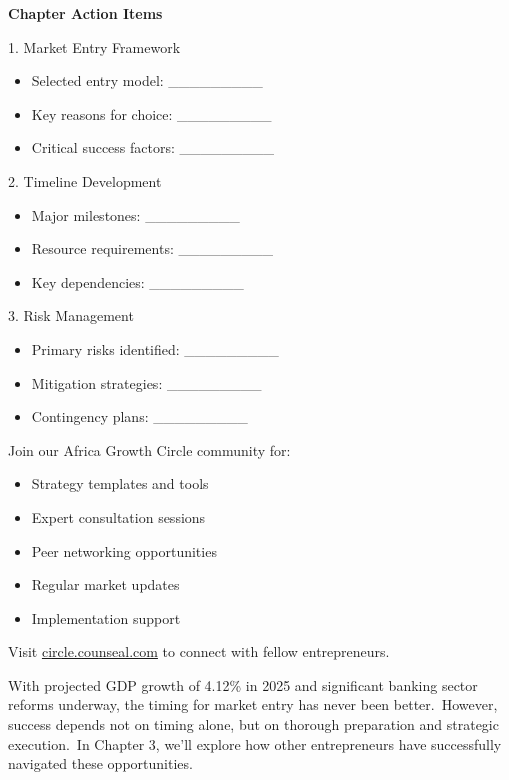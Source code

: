 \begin{workshopbox}
\textbf{Chapter Action Items}

1. Market Entry Framework
\begin{itemize}
    \item Selected entry model: \_\_\_\_\_\_\_\_\_
    \item Key reasons for choice: \_\_\_\_\_\_\_\_\_
    \item Critical success factors: \_\_\_\_\_\_\_\_\_
\end{itemize}

2. Timeline Development
\begin{itemize}
    \item Major milestones: \_\_\_\_\_\_\_\_\_
    \item Resource requirements: \_\_\_\_\_\_\_\_\_
    \item Key dependencies: \_\_\_\_\_\_\_\_\_
\end{itemize}

3. Risk Management
\begin{itemize}
    \item Primary risks identified: \_\_\_\_\_\_\_\_\_
    \item Mitigation strategies: \_\_\_\_\_\_\_\_\_
    \item Contingency plans: \_\_\_\_\_\_\_\_\_
\end{itemize}
\end{workshopbox}

\begin{communitybox}
Join our Africa Growth Circle community for:
\begin{itemize}
    \item Strategy templates and tools
    \item Expert consultation sessions
    \item Peer networking opportunities
    \item Regular market updates
    \item Implementation support
\end{itemize}
Visit \href{https://viz.li/csl-book-ngbiz}{circle.counseal.com} to connect with fellow entrepreneurs.
\end{communitybox}

\begin{importantbox}
With projected GDP growth of 4.12\% in 2025 and significant banking sector reforms underway, the timing for market entry has never been better.\ However, success depends not on timing alone, but on thorough preparation and strategic execution.\ In Chapter 3, we'll explore how other entrepreneurs have successfully navigated these opportunities.
\end{importantbox}
